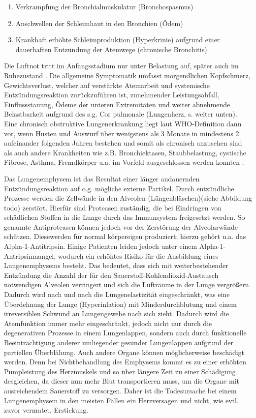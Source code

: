 \begin{enumerate}
\item Verkrampfung der Bronchialmuskulatur (Bronchospasmus)
\item Anschwellen der Schleimhaut in den Bronchien (Ödem)
\item Krankhaft erhöhte Schleimproduktion (Hyperkrinie) aufgrund einer dauerhaften Entzündung der Atemwege (chronische Bronchitis)
\end{enumerate}

Die Luftnot tritt im Anfangsstadium nur unter Belastung auf, später auch im Ruhezustand \autocite[vgl.][6f.]{lorenz2009}. Die allgemeine Symptomatik umfasst morgendlichen Kopfschmerz, Gewichtsverlust, welcher auf verstärkte Atemarbeit und systemische Entzündungsreaktion zurückzuführen ist, zunehmender Leistungsabfall, Einflussstauung, Ödeme der unteren Extremitäten und weiter abnehmende Belastbarkeit aufgrund des s.g. Cor pulmonale (Lungenherz, s. weiter unten).
Eine chronisch obstruktive Lungenerkrankung liegt laut WHO-Definition dann vor, wenn Husten und Auswurf über wenigstens als 3 Monate in mindestens 2 aufeinander folgenden Jahren bestehen und somit als chronisch anzusehen sind als auch andere Krankheiten wie z.B. Bronchiektasen, Staubbelastung, cystische Fibrose, Asthma, Fremdkörper u.a. im Vorfeld ausgeschlossen werden konnten \autocite[vgl.][71]{koehler2010}. 


Das Lungenemphysem ist das Resultat einer länger andauernden Entzündungsreaktion auf o.g. mögliche externe Partikel. Durch entzündliche Prozesse  werden die Zellwände in den Alveolen  (Lüngenbläschen)(siehe Abbildung todo) zerstört. Hierfür sind Proteasen zuständig, die bei Eindringen von schädlichen Stoffen in die Lunge durch das Immunsystem freigesetzt werden. So genannte Antiproteasen können jedoch vor der Zerstörung der Alveolarwände schützen. Diesewerden für normal körpereigen produziert; hierzu gehört u.a. das Alpha-1-Antitripsin. Einige Patienten leiden jedoch unter einem Alpha-1-Antripsinmangel, wodurch ein erhöhtes Risiko für die Ausbildung eines Lungenemphysems besteht.
Das bedeutet, dass sich mit weiterbestehender Entzündung die Anzahl der für den Sauerstoff-Kohlendioxid-Austausch notwendigen Alveolen verringert und sich die Lufträume in der Lunge vergrößern. Dadurch wird nach und nach die Lungenelastizität eingeschränkt, was eine Überdehnung der Lunge (Hyperinlation) mit Minderdurchblutung und einem irreversiblen Schwund an Lungengewebe nach sich zieht. Dadurch wird die Atemfunktion immer mehr eingeschränkt, jedoch nicht nur durch die degenerativen Prozesse in einem Lungenlappen, sondern auch durch funktionelle Beeinträchtigung anderer umliegender gesunder Lungenlappen aufgrund der partiellen Überblähung. Auch andere Organe können möglicherweise beschädigt werden. Denn bei Nichtbehandlung des Emphysems kommt es zu einer erhöhten Pumpleistung des Herzmuskels und so über längere Zeit zu einer Schädigung desgleichen, da dieser nun mehr Blut transportieren muss, um die Organe mit ausreichendem Sauerstoff zu versorgen. Daher ist die Todesursache bei einem Lungenemphysem in den meisten Fällen ein Herzversagen und nicht, wie evtl. zuvor vermutet, Erstickung.

